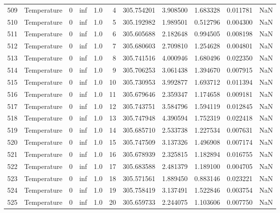 \begin{tabular}{llrrrrrrrrr}
509 &  Temperature &       0 &  inf &  1.0 &    4 &  305.754201 &  3.908500 &  1.683328 &   0.011781 &      NaN \\
510 &  Temperature &       0 &  inf &  1.0 &    5 &  305.192982 &  1.989501 &  0.512796 &   0.004300 &      NaN \\
511 &  Temperature &       0 &  inf &  1.0 &    6 &  305.605688 &  2.182648 &  0.994505 &   0.008198 &      NaN \\
512 &  Temperature &       0 &  inf &  1.0 &    7 &  305.680603 &  2.709810 &  1.254628 &   0.004801 &      NaN \\
513 &  Temperature &       0 &  inf &  1.0 &    8 &  305.741516 &  4.000946 &  1.680496 &   0.022350 &      NaN \\
514 &  Temperature &       0 &  inf &  1.0 &    9 &  305.706253 &  3.061438 &  1.394670 &   0.007915 &      NaN \\
515 &  Temperature &       0 &  inf &  1.0 &   10 &  305.730953 &  3.992877 &  1.693712 &   0.011394 &      NaN \\
516 &  Temperature &       0 &  inf &  1.0 &   11 &  305.679646 &  2.359347 &  1.174658 &   0.009181 &      NaN \\
517 &  Temperature &       0 &  inf &  1.0 &   12 &  305.743751 &  3.584796 &  1.594119 &   0.012845 &      NaN \\
518 &  Temperature &       0 &  inf &  1.0 &   13 &  305.747948 &  4.390594 &  1.752319 &   0.022418 &      NaN \\
519 &  Temperature &       0 &  inf &  1.0 &   14 &  305.685710 &  2.533738 &  1.227534 &   0.007631 &      NaN \\
520 &  Temperature &       0 &  inf &  1.0 &   15 &  305.747509 &  3.137326 &  1.496908 &   0.007174 &      NaN \\
521 &  Temperature &       0 &  inf &  1.0 &   16 &  305.678939 &  2.325815 &  1.182894 &   0.016755 &      NaN \\
522 &  Temperature &       0 &  inf &  1.0 &   17 &  305.683588 &  2.481379 &  1.189100 &   0.004705 &      NaN \\
523 &  Temperature &       0 &  inf &  1.0 &   18 &  305.571561 &  1.889450 &  0.883146 &   0.023221 &      NaN \\
524 &  Temperature &       0 &  inf &  1.0 &   19 &  305.758419 &  3.137491 &  1.522846 &   0.003754 &      NaN \\
525 &  Temperature &       0 &  inf &  1.0 &   20 &  305.659733 &  2.244075 &  1.103606 &   0.007750 &      NaN \\

\end{tabular}
